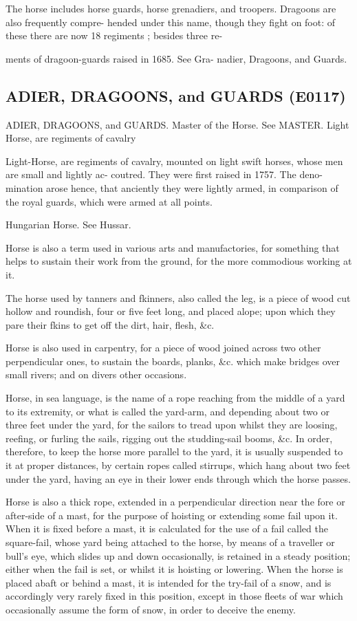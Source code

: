 \documentclass{article}
\begin{document}
The horse includes horse guards, horse grenadiers,
and troopers. Dragoons are also frequently compre-
hended under this name, though they fight on foot:
of these there are now 18 regiments ; besides three re-

ments of dragoon-guards raised in 1685. See Gra-
nadier, Dragoons, and Guards.

\subsection*{ADIER, DRAGOONS, and GUARDS (E0117)}
ADIER, DRAGOONS, and GUARDS.
Master of the Horse. See MASTER.
Light Horse, are regiments of cavalry

Light-Horse, are regiments of cavalry, mounted on
light swift horses, whose men are small and lightly ac-
coutred. They were first raised in 1757. The deno-
mination arose hence, that anciently they were lightly
armed, in comparison of the royal guards, which were
armed at all points.

Hungarian Horse. See Hussar.

Horse is also a term used in various arts and manufactories, for something that helps to sustain their work from the ground, for the more commodious working at it.

The horse used by tanners and fkinners, also called
the leg, is a piece of wood cut hollow and roundish,
four or five feet long, and placed alope; upon which
they pare their fkins to get off the dirt, hair, flesh, \&c.

Horse is also used in carpentry, for a piece of wood
joined across two other perpendicular ones, to sustain
the boards, planks, \&c. which make bridges over small
rivers; and on divers other occasions.

Horse, in sea language, is the name of a rope reaching from the middle of a yard to its extremity, or what is called the yard-arm, and depending about two or three feet under the yard, for the sailors to tread upon whilst they are loosing, reefing, or furling the sails, rigging out the studding-sail booms, \&c. In order, therefore, to keep the horse more parallel to the yard, it is usually suspended to it at proper distances, by certain ropes called stirrups, which hang about two feet under the yard, having an eye in their lower ends through which the horse passes.

Horse is also a thick rope, extended in a perpendicular direction near the fore or after-side of a mast, for the purpose of hoisting or extending some fail upon it. When it is fixed before a mast, it is calculated for the use of a fail called the square-fail, whose yard being attached to the horse, by means of a traveller or bull's eye, which slides up and down occasionally, is retained in a steady position; either when the fail is set, or whilst it is hoisting or lowering. When the horse is placed abaft or behind a mast, it is intended for the try-fail of a snow, and is accordingly very rarely fixed in this position, except in those fleets of war which occasionally assume the form of snow, in order to deceive the enemy.
\end{document}
